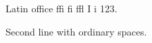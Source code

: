 \documentclass{article}
\begin{document}
Latin office ffi fi ffl I i 123.
\par
Second line with ordinary spaces.
\end{document}
